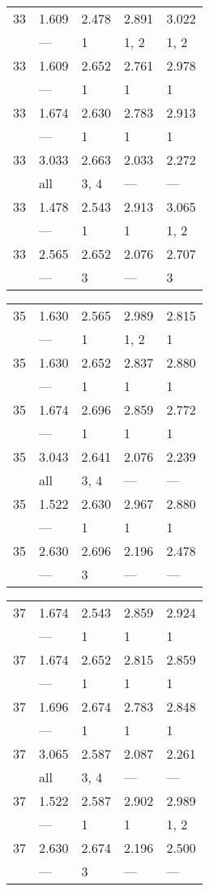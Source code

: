 \begin{tabular}{lllll}
\toprule
 33 & 1.609 & 2.478 & 2.891 & 3.022 \\
    & ---   & 1     & 1, 2  & 1, 2  \\
 33 & 1.609 & 2.652 & 2.761 & 2.978 \\
    & ---   & 1     & 1     & 1     \\
 33 & 1.674 & 2.630 & 2.783 & 2.913 \\
    & ---   & 1     & 1     & 1     \\
 33 & 3.033 & 2.663 & 2.033 & 2.272 \\
    & all   & 3, 4  & ---   & ---   \\
 33 & 1.478 & 2.543 & 2.913 & 3.065 \\
    & ---   & 1     & 1     & 1, 2  \\
 33 & 2.565 & 2.652 & 2.076 & 2.707 \\
    & ---   & 3     & ---   & 3     \\
\bottomrule
\end{tabular}
\begin{tabular}{lllll}
\toprule
 35 & 1.630 & 2.565 & 2.989 & 2.815 \\
    & ---   & 1     & 1, 2  & 1     \\
 35 & 1.630 & 2.652 & 2.837 & 2.880 \\
    & ---   & 1     & 1     & 1     \\
 35 & 1.674 & 2.696 & 2.859 & 2.772 \\
    & ---   & 1     & 1     & 1     \\
 35 & 3.043 & 2.641 & 2.076 & 2.239 \\
    & all   & 3, 4  & ---   & ---   \\
 35 & 1.522 & 2.630 & 2.967 & 2.880 \\
    & ---   & 1     & 1     & 1     \\
 35 & 2.630 & 2.696 & 2.196 & 2.478 \\
    & ---   & 3     & ---   & ---   \\
\bottomrule
\end{tabular}
\begin{tabular}{lllll}
\toprule
 37 & 1.674 & 2.543 & 2.859 & 2.924 \\
    & ---   & 1     & 1     & 1     \\
 37 & 1.674 & 2.652 & 2.815 & 2.859 \\
    & ---   & 1     & 1     & 1     \\
 37 & 1.696 & 2.674 & 2.783 & 2.848 \\
    & ---   & 1     & 1     & 1     \\
 37 & 3.065 & 2.587 & 2.087 & 2.261 \\
    & all   & 3, 4  & ---   & ---   \\
 37 & 1.522 & 2.587 & 2.902 & 2.989 \\
    & ---   & 1     & 1     & 1, 2  \\
 37 & 2.630 & 2.674 & 2.196 & 2.500 \\
    & ---   & 3     & ---   & ---   \\
\bottomrule
\end{tabular}
